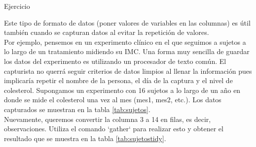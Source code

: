 \documentclass[]{article}
\begin{document}
\begin{bclogo}[
  couleur=llred,
  arrondi=0,
  logo=\bcstop,
  barre=none,
  noborder=true]{Ejercicio}

Este tipo de formato de datos (poner valores de variables en las columnas) 
es útil también cuando se capturan datos al evitar la repetición de valores. \\

Por ejemplo, pensemos en un experimento clínico en el que seguimos a sujetos
a lo largo de un tratamiento midiendo su IMC. Una forma muy
sencilla de guardar los datos del experimento es utilizando un procesador
de texto común. El capturista no querrá seguir criterios de datos limpios
al llenar la información pues implicaría repetir el nombre de la persona,
el día de la captura y el nivel de colesterol. Supongamos un experimento con
16 sujetos a lo largo de un año en donde se mide el colesterol una vez al mes (mes1, mes2, etc.). Los datos capturados se muestran en la tabla \ref{tab:sujetos}. \\

Nuevamente, queremos convertir la columna 3 a 14 en filas, es decir, observaciones.
Utiliza el comando `gather` para realizar esto y obtener el resultado que se
muestra en la tabla \ref{tab:sujetostidy}.
\end{bclogo}
\end{document}
